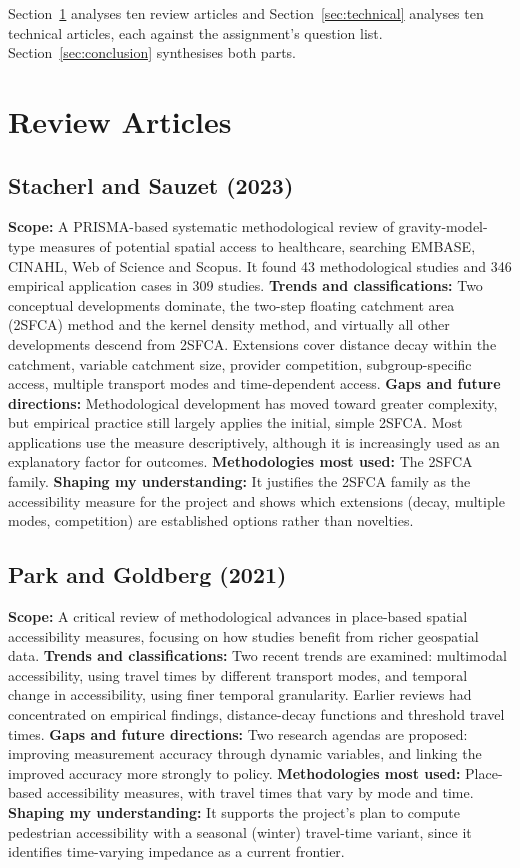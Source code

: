 \documentclass[journal]{IEEEtran}
\begin{document}
Section~\ref{sec:reviews} analyses ten review articles and Section~\ref{sec:technical} analyses ten technical articles, each against the assignment's question list. Section~\ref{sec:conclusion} synthesises both parts.

\section{Review Articles}
\label{sec:reviews}

\subsection{Stacherl and Sauzet (2023) \cite{stacherl2023}}
\textbf{Scope:} A PRISMA-based systematic methodological review of gravity-model-type measures of potential spatial access to healthcare, searching EMBASE, CINAHL, Web of Science and Scopus. It found 43 methodological studies and 346 empirical application cases in 309 studies.
\textbf{Trends and classifications:} Two conceptual developments dominate, the two-step floating catchment area (2SFCA) method and the kernel density method, and virtually all other developments descend from 2SFCA. Extensions cover distance decay within the catchment, variable catchment size, provider competition, subgroup-specific access, multiple transport modes and time-dependent access.
\textbf{Gaps and future directions:} Methodological development has moved toward greater complexity, but empirical practice still largely applies the initial, simple 2SFCA. Most applications use the measure descriptively, although it is increasingly used as an explanatory factor for outcomes.
\textbf{Methodologies most used:} The 2SFCA family.
\textbf{Shaping my understanding:} It justifies the 2SFCA family as the accessibility measure for the project and shows which extensions (decay, multiple modes, competition) are established options rather than novelties.

\subsection{Park and Goldberg (2021) \cite{park2021}}
\textbf{Scope:} A critical review of methodological advances in place-based spatial accessibility measures, focusing on how studies benefit from richer geospatial data.
\textbf{Trends and classifications:} Two recent trends are examined: multimodal accessibility, using travel times by different transport modes, and temporal change in accessibility, using finer temporal granularity. Earlier reviews had concentrated on empirical findings, distance-decay functions and threshold travel times.
\textbf{Gaps and future directions:} Two research agendas are proposed: improving measurement accuracy through dynamic variables, and linking the improved accuracy more strongly to policy.
\textbf{Methodologies most used:} Place-based accessibility measures, with travel times that vary by mode and time.
\textbf{Shaping my understanding:} It supports the project's plan to compute pedestrian accessibility with a seasonal (winter) travel-time variant, since it identifies time-varying impedance as a current frontier.
\end{document}
